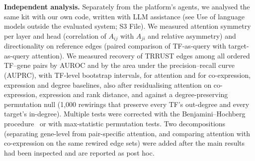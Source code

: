 \textbf{Independent analysis.} Separately from the platform's agents, we analysed the same kit with our own code, written with LLM assistance (see Use of language models outside the evaluated system; S3 File). We measured attention symmetry per layer and head (correlation of $A_{ij}$ with $A_{ji}$ and relative asymmetry) and directionality on reference edges (paired comparison of TF-as-query with target-as-query attention). We measured recovery of TRRUST edges among all ordered TF--gene pairs by AUROC and by the area under the precision--recall curve (AUPRC), with TF-level bootstrap intervals, for attention and for co-expression, expression and degree baselines, also after residualising attention on co-expression, expression and rank distance, and against a degree-preserving permutation null (1,000 rewirings that preserve every TF's out-degree and every target's in-degree). Multiple tests were corrected with the Benjamini--Hochberg procedure~\cite{benjamini1995fdr} or with max-statistic permutation tests. Two decompositions (separating gene-level from pair-specific attention, and comparing attention with co-expression on the same rewired edge sets) were added after the main results had been inspected and are reported as post hoc.

